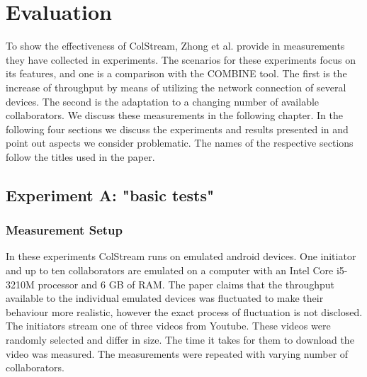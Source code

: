 \chapter{Evaluation}\label{chap:ContCaptions}
To show the effectiveness of ColStream, Zhong et al. provide in \cite{ColStream} measurements they have collected in experiments. The scenarios for these experiments focus on its features, and one is a comparison with the COMBINE tool. The first is the increase of throughput by means of utilizing the network connection of several devices. The second is the adaptation to a changing number of available collaborators. We discuss these measurements in the following chapter. In the following four sections we discuss the experiments and results presented in \cite{ColStream} and point out aspects we consider problematic. The names of the respective sections follow the titles used in the paper.
\section{Experiment A: "basic tests"}
\subsection{Measurement Setup}
In these experiments ColStream runs on emulated android devices. One initiator and up to ten collaborators are emulated on a computer with an Intel Core i5-3210M processor and 6 GB of RAM. The paper claims that the throughput available to the individual emulated devices was fluctuated to make their behaviour more realistic, however the exact process of fluctuation is not disclosed. The initiators stream one of three videos from Youtube. These videos were randomly selected and differ in size. The time it takes for them to download the video was measured. The measurements were repeated with varying number of collaborators. 
